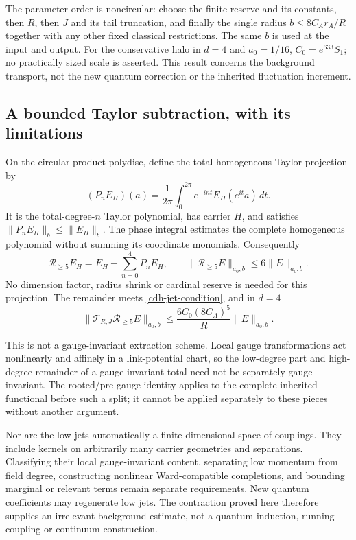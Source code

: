 The parameter order is noncircular: choose the finite reserve
and its constants, then $R$, then $J$ and its tail truncation,
and finally the single radius $b\leq8C_A r_A/R$ together with
any other fixed classical restrictions. The same $b$ is used
at the input and output. For the conservative halo in $d=4$
and $a_0=1/16$, $C_0=e^{633}S_1$; no practically sized scale
is asserted. This result concerns the background transport,
not the new quantum correction or the inherited fluctuation
increment.

\subsection{A bounded Taylor subtraction, with its limitations}
\label{cdh-projection-section}

On the circular product polydisc, define the total homogeneous
Taylor projection by
\begin{equation}
 (P_nE_H)(a)=\frac1{2\pi}\int_0^{2\pi}
               e^{-int}E_H(e^{it}a)\,dt.
 \label{cdh-phase-projection}
\end{equation}
It is the total-degree-$n$ Taylor polynomial, has carrier
$H$, and satisfies $\|P_nE_H\|_b\leq\|E_H\|_b$.
The phase integral estimates the complete homogeneous
polynomial without summing its coordinate monomials.
Consequently
\begin{equation}
 \mathcal R_{\geq5}E_H
     =E_H-\sum_{n=0}^4P_nE_H,\qquad
 \|\mathcal R_{\geq5}E\|_{a_0,b}\leq6\|E\|_{a_0,b}.
 \label{cdh-projection-bound}
\end{equation}
No dimension factor, radius shrink or cardinal reserve is
needed for this projection. The remainder meets
\eqref{cdh-jet-condition}, and in $d=4$
\begin{equation}
 \|\mathcal T_{R,J}\mathcal R_{\geq5}E\|_{a_0,b}
 \leq\frac{6C_0(8C_A)^5}{R}\|E\|_{a_0,b}.
 \label{cdh-projected-bound}
\end{equation}

This is not a gauge-invariant extraction scheme. Local gauge
transformations act nonlinearly and affinely in a link-potential
chart, so the low-degree part and high-degree remainder of a
gauge-invariant total need not be separately gauge invariant.
The rooted/pre-gauge identity applies to the complete
inherited functional before such a split; it cannot be applied
separately to these pieces without another argument.

Nor are the low jets automatically a finite-dimensional space
of couplings. They include kernels on arbitrarily many carrier
geometries and separations. Classifying their local
gauge-invariant content, separating low momentum from field
degree, constructing nonlinear Ward-compatible completions,
and bounding marginal or relevant terms remain separate
requirements. New quantum coefficients may regenerate low
jets. The contraction proved here therefore supplies an
irrelevant-background estimate, not a quantum induction,
running coupling or continuum construction.

